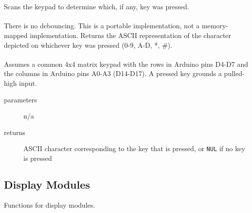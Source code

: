         \begin{itemize}
             \\ \\
            Scans the keypad to determine which, if any, key was pressed. \\ \\
            There is no debouncing.
            This is a portable implementation, not a memory-mapped implementation.
            Returns the ASCII representation of the character depicted on whichever key was pressed (0-9, A-D, *, \#). \\ \\
            Assumes a common 4x4 matrix keypad with the rows in Arduino pins D4-D7 and the columns in Arduino pins A0-A3 (D14-D17).
            A pressed key grounds a pulled-high input.
            \begin{description}
                \item[parameters] n/a
                \item[returns] ASCII character corresponding to the key that is pressed, or \texttt{NUL} if no key is pressed
            \end{description}

        \end{itemize}


    \subsection{Display Modules}

    Functions for display modules.

